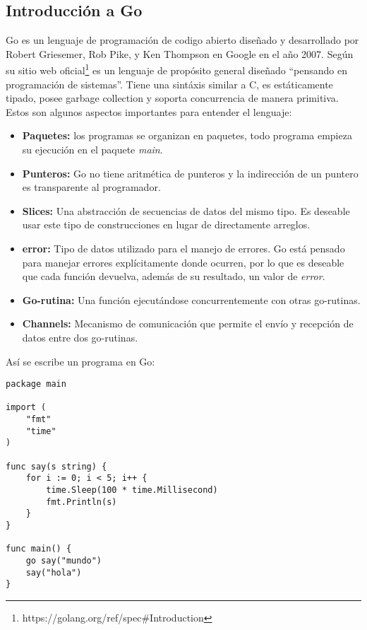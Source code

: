 \subsection{Introducción a Go}

Go es un lenguaje de programación de codigo abierto diseñado y desarrollado por
Robert Griesemer, Rob Pike, y Ken Thompson en Google en el año 2007. Según su
sitio web oficial\footnote{https://golang.org/ref/spec\#Introduction} es un
lenguaje de propósito general diseñado ``pensando en programación de
sistemas''. Tiene una sintáxis similar a C, es estáticamente tipado, posee
garbage collection y soporta concurrencia de manera primitiva.\\

Estos son algunos aspectos importantes para entender el lenguaje:\\

\begin{itemize}

\item \textbf{Paquetes:} los programas se organizan en paquetes, todo programa
     empieza su ejecución en el paquete \textit{main}.

\item \textbf{Punteros:} Go no tiene aritmética de punteros y la indirección
     de un puntero es transparente al programador.

\item \textbf{Slices:} Una abstracción de secuencias de datos del mismo tipo.
     Es deseable usar este tipo de construcciones en lugar de directamente
     arreglos.

\item \textbf{error:} Tipo de datos utilizado para el manejo de errores. Go
     está pensado para manejar errores explícitamente donde ocurren, por lo que
     es deseable que cada función devuelva, además de su resultado, un valor de
     \textit{error}.

\item \textbf{Go-rutina:} Una función ejecutándose concurrentemente con otras
     go-rutinas.

\item \textbf{Channels:} Mecanismo de comunicación que permite el envío y
     recepción de datos entre dos go-rutinas.

\end{itemize}

Así se escribe un programa en Go:

\begin{verbatim}
package main

import (
    "fmt"
    "time"
)

func say(s string) {
    for i := 0; i < 5; i++ {
        time.Sleep(100 * time.Millisecond)
        fmt.Println(s)
    }
}

func main() {
    go say("mundo")
    say("hola")
}
\end{verbatim}

